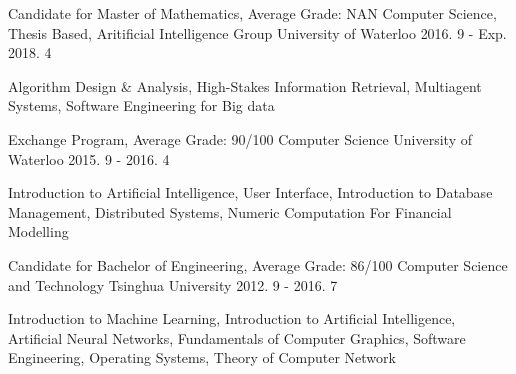 \begin{cventries}
 
  \cventry
    {Candidate for Master of Mathematics, Average Grade: NAN}
    {Computer Science, Thesis Based, Aritificial Intelligence Group}
    {University of Waterloo}
    {2016. 9 - Exp. 2018. 4}
    {
      \begin{cvitems}
      \item{Algorithm Design \& Analysis, High-Stakes Information Retrieval, Multiagent Systems, Software Engineering for Big data}
      \end{cvitems}
    }

  \cventry
    {Exchange Program, Average Grade: 90/100}
    {Computer Science}
    {University of Waterloo}
    {2015. 9 - 2016. 4}
    {
      \begin{cvitems}
        \item {Introduction to Artificial Intelligence, User Interface, Introduction to Database Management, Distributed Systems, Numeric Computation For Financial Modelling}
      \end{cvitems}
    }
  \cventry
    {Candidate for Bachelor of Engineering, Average Grade: 86/100}
    {Computer Science and Technology}
    {Tsinghua University}
    {2012. 9 - 2016. 7}
    {
      \begin{cvitems}
        \item {Introduction to Machine Learning, Introduction to Artificial Intelligence, Artificial Neural Networks, Fundamentals of Computer Graphics, Software Engineering, Operating Systems, Theory of Computer Network}
      \end{cvitems}
    }

\end{cventries}
